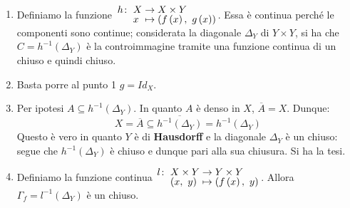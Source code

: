 \begin{demonstration}~{}
	\begin{enumerate}[label=\Roman*]
		\item Definiamo la funzione $\funztot{h}{X}{X\times Y}{x}{\left(f\left(x\right),\ g\left(x\right)\right)}$. Essa è continua perché le componenti sono continue; considerata la diagonale $\Delta_{Y}$ di $Y\times Y$, si ha che $C=h^{-1}\left(\Delta_Y\right)$ è la controimmagine tramite una funzione continua di un chiuso e quindi chiuso.
		\item Basta porre al punto 1 $g=Id_{X}$.
		\item Per ipotesi $A\subseteq h^{-1}\left(\Delta_Y\right)$. In quanto $A$ è denso in $X$, $\overline{A}=X$. Dunque:
		\begin{equation*}
			X=\overline{A}\subseteq\overline{h^{-1}\left(\Delta_Y\right)}=h^{-1}\left(\Delta_Y\right)
		\end{equation*}
		Questo è vero in quanto $Y$ è di \textbf{Hausdorff} e la diagonale $\Delta_Y$ è un chiuso: segue che $h^{-1}\left(\Delta_Y\right)$ è chiuso e dunque pari alla sua chiusura. Si ha la tesi.
		\item Definiamo la funzione continua $\funztot{l}{X\times Y}{Y\times Y}{\left(x,\ y\right)}{\left(f\left(x\right),\ y\right)}$. Allora $\Gamma_f=l^{-1}\left(\Delta_Y\right)$ è un chiuso.
	\end{enumerate}
\end{demonstration}
